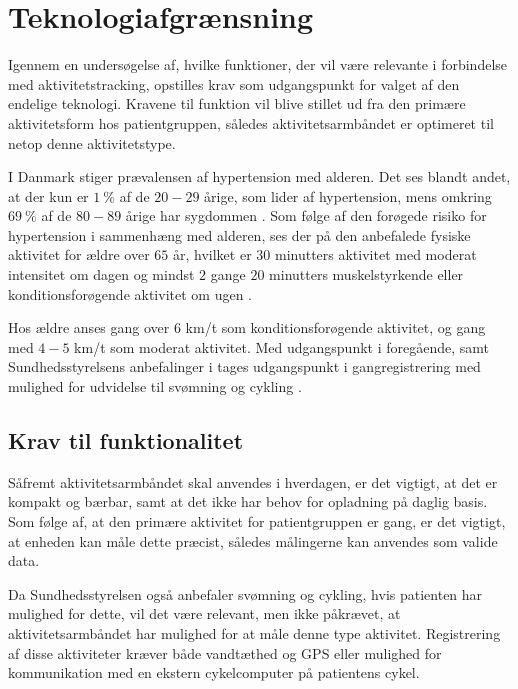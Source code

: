 \section{Teknologiafgrænsning} \label{afgraensning_tek}

Igennem en undersøgelse af, hvilke funktioner, der vil være relevante i forbindelse med aktivitetstracking, opstilles krav som udgangspunkt for valget af den endelige teknologi. Kravene til funktion vil blive stillet ud fra den primære aktivitetsform hos patientgruppen, således aktivitetsarmbåndet er optimeret til netop denne aktivitetstype.

I Danmark stiger prævalensen af hypertension med alderen. Det ses blandt andet, at der kun er $1~\%$ af de $20-29$ årige, som lider af hypertension, mens omkring $69~\%$ af de $80-89$ årige har sygdommen \citep{olsen2015}. Som følge af den forøgede risiko for hypertension i sammenhæng med alderen, ses der på den anbefalede fysiske aktivitet for ældre over $65$ år, hvilket er $30$ minutters aktivitet med moderat intensitet om dagen og mindst $2$ gange $20$ minutters muskelstyrkende eller konditionsforøgende aktivitet om ugen \citep{pedersen2011}.

Hos ældre anses gang over $6$ km/t som konditionsforøgende aktivitet, og gang med $4-5$ km/t som moderat aktivitet. Med udgangspunkt i foregående, samt Sundhedsstyrelsens anbefalinger i  tages udgangspunkt i gangregistrering med mulighed for udvidelse til svømning og cykling \citep{pedersen2011}.

\subsection{Krav til funktionalitet}

Såfremt aktivitetsarmbåndet skal anvendes i hverdagen, er det vigtigt, at det er kompakt og bærbar, samt at det ikke har behov for opladning på daglig basis. Som følge af, at den primære aktivitet for patientgruppen er gang, er det vigtigt, at enheden kan måle dette præcist, således målingerne kan anvendes som valide data. 

Da Sundhedsstyrelsen også anbefaler svømning og cykling, hvis patienten har mulighed for dette, vil det være relevant, men ikke påkrævet, at aktivitetsarmbåndet har mulighed for at måle denne type aktivitet. Registrering af disse aktiviteter kræver både vandtæthed og GPS eller mulighed for kommunikation med en ekstern cykelcomputer på patientens cykel.

